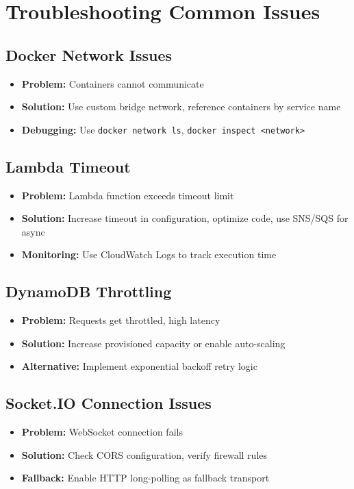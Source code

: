 \section{Troubleshooting Common Issues}

\subsection{Docker Network Issues}

\begin{itemize}
    \item \textbf{Problem:} Containers cannot communicate
    \item \textbf{Solution:} Use custom bridge network, reference containers by service name
    \item \textbf{Debugging:} Use \texttt{docker network ls}, \texttt{docker inspect <network>}
\end{itemize}

\subsection{Lambda Timeout}

\begin{itemize}
    \item \textbf{Problem:} Lambda function exceeds timeout limit
    \item \textbf{Solution:} Increase timeout in configuration, optimize code, use SNS/SQS for async
    \item \textbf{Monitoring:} Use CloudWatch Logs to track execution time
\end{itemize}

\subsection{DynamoDB Throttling}

\begin{itemize}
    \item \textbf{Problem:} Requests get throttled, high latency
    \item \textbf{Solution:} Increase provisioned capacity or enable auto-scaling
    \item \textbf{Alternative:} Implement exponential backoff retry logic
\end{itemize}

\subsection{Socket.IO Connection Issues}

\begin{itemize}
    \item \textbf{Problem:} WebSocket connection fails
    \item \textbf{Solution:} Check CORS configuration, verify firewall rules
    \item \textbf{Fallback:} Enable HTTP long-polling as fallback transport
\end{itemize}

\newpage
